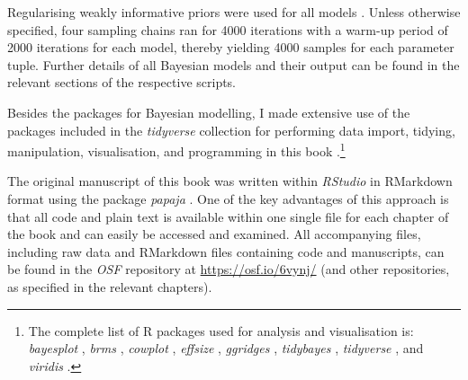 Regularising weakly informative priors were used for all models \citep{lemoineMovingNoninformativePriors2019}. Unless otherwise specified, four sampling chains ran for 4000 iterations with a warm-up period of 2000 iterations for each model, thereby yielding 4000 samples for each parameter tuple. Further details of all Bayesian models and their output can be found in the relevant sections of the respective scripts.

Besides the packages for Bayesian modelling, I made extensive use of the packages included in the \emph{tidyverse} collection for performing data import, tidying, manipulation, visualisation, and programming in this book \citep{wickhamWelcomeTidyverse2019a}.\footnote{The complete list of R packages used for analysis and visualisation is: \emph{bayesplot} \citep[Version 1.8.1;][]{gabryBayesplot2022}, \emph{brms} \citep[Version 2.15.0;][]{burknerBrmsPackageBayesian2017}, \emph{cowplot} \citep[Version 1.1.1;][]{wilke2019cowplot}, \emph{effsize} \citep[Version 0.8.1;][]{torchiano2020effsize}, \emph{ggridges} \citep[Version 0.5.3;][]{wilke2021ggridges}, \emph{tidybayes} \citep[Version 3.0.0;][]{kay2023tidy}, \emph{tidyverse} \citep[Version 1.3.1;][]{wickhamWelcomeTidyverse2019a}, and \emph{viridis} \citep[Version 0.6.1;][]{garnier2023viridis}.}

The original manuscript of this book was written within \emph{RStudio} in RMarkdown format \citep{allaire2020rmarkdown} using the package \emph{papaja} \citep{aust2020papaja}. One of the key advantages of this approach is that all code and plain text is available within one single file for each chapter of the book and can easily be accessed and examined. All accompanying files, including raw data and RMarkdown files containing code and manuscripts, can be found in the \textit{OSF} repository at \url{https://osf.io/6vynj/} (and other repositories, as specified in the relevant chapters).
